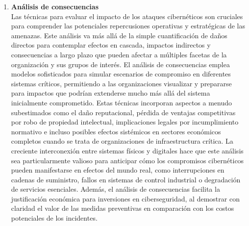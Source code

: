\begin{enumerate}
\item \textbf{Análisis de consecuencias} \\
Las técnicas para evaluar el impacto de los ataques cibernéticos son cruciales para comprender las potenciales repercusiones operativas y estratégicas de las amenazas. Este análisis va más allá de la simple cuantificación de daños directos para contemplar efectos en cascada, impactos indirectos y consecuencias a largo plazo que pueden afectar a múltiples facetas de la organización y sus grupos de interés. El análisis de consecuencias emplea modelos sofisticados para simular escenarios de compromiso en diferentes sistemas críticos, permitiendo a las organizaciones visualizar y prepararse para impactos que podrían extenderse mucho más allá del sistema inicialmente comprometido. Estas técnicas incorporan aspectos a menudo subestimados como el daño reputacional, pérdida de ventajas competitivas por robo de propiedad intelectual, implicaciones legales por incumplimiento normativo e incluso posibles efectos sistémicos en sectores económicos completos cuando se trata de organizaciones de infraestructura crítica. La creciente interconexión entre sistemas físicos y digitales hace que este análisis sea particularmente valioso para anticipar cómo los compromisos cibernéticos pueden manifestarse en efectos del mundo real, como interrupciones en cadenas de suministro, fallos en sistemas de control industrial o degradación de servicios esenciales. Además, el análisis de consecuencias facilita la justificación económica para inversiones en ciberseguridad, al demostrar con claridad el valor de las medidas preventivas en comparación con los costos potenciales de los incidentes.
\end{enumerate}


